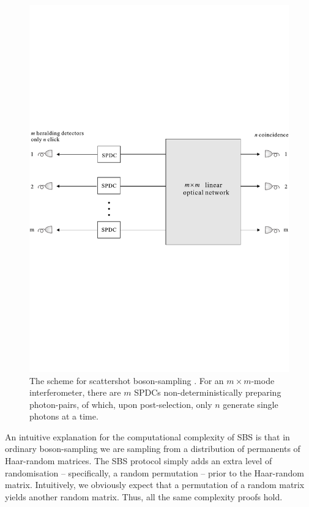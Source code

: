 \documentclass[aps,rmp,twocolumn,amsmath,amssymb,nofootinbib,superscriptaddress]{revtex4}
\begin{document}
\begin{figure}[!htb]
\includegraphics[width=\columnwidth]{scattershot_model}
\caption{The scheme for scattershot boson-sampling \cite{bib:36}. For an \mbox{$m\times m$}-mode interferometer, there are $m$ SPDCs non-deterministically preparing photon-pairs, of which, upon post-selection, only $n$ generate single photons at a time.} \label{fig:scattershot_model}
\end{figure}

An intuitive explanation for the computational complexity of SBS is that in ordinary boson-sampling we are sampling from a distribution of permanents of Haar-random matrices. The SBS protocol simply adds an extra level of randomisation -- specifically, a random permutation -- prior to the Haar-random matrix. Intuitively, we obviously expect that a permutation of a random matrix yields another random matrix. Thus, all the same complexity proofs hold.
\end{document}
